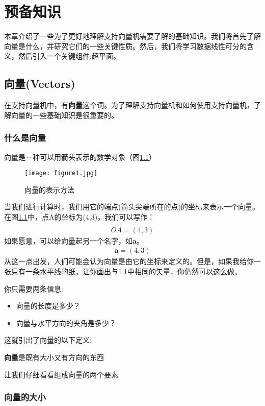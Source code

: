 \chapter{预备知识}

本章介绍了一些为了更好地理解支持向量机需要了解的基础知识。我们将首先了解向量是什么，并研究它们的一些关键性质。然后，我们将学习数据线性可分的含义，然后引入一个关键组件:超平面。

\section{向量(Vectors)}

在支持向量机中，有\textbf{向量}这个词。为了理解支持向量机和如何使用支持向量机，了解向量的一些基础知识是很重要的。

\subsection{什么是向量}

向量是一种可以用箭头表示的数学对象（图\ref{figure1}）

\begin{figure}[ht]
    \centering
    \texttt{[image: figure1.jpg]}
    \caption{向量的表示方法}
    \label{figure1}
\end{figure}


当我们进行计算时，我们用它的端点(箭头尖端所在的点)的坐标来表示一个向量。在图\ref{figure1}中，点A的坐标为(4,3)。我们可以写作：
\begin{gather*}
\vec{OA} = (4,3)
\end{gather*}
如果愿意，可以给向量起另一个名字，如$\mathbf{a}$。
\begin{gather*}
\mathbf{a} = (4,3)
\end{gather*}
从这一点出发，人们可能会认为向量是由它的坐标来定义的。但是，如果我给你一张只有一条水平线的纸，让你画出与\ref{figure1}中相同的矢量，你仍然可以这么做。

你只需要两条信息:
\begin{itemize}
    \item 向量的长度是多少？
    \item 向量与水平方向的夹角是多少？
\end{itemize}

这就引出了向量的以下定义:

\textbf{向量}是既有大小又有方向的东西

让我们仔细看看组成向量的两个要素

\subsection{向量的大小}

